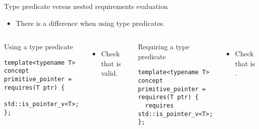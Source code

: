 \begin{frame}[t,fragile]{Type predicate versus nested requirements evaluation}
\begin{itemize}
  \item There is a difference when using type predicates.
\end{itemize}

\begin{columns}[T]

\begin{block}{Using a type predicate}
\begin{lstlisting}
template<typename T>
concept primitive_pointer = requires(T ptr) {
  std::is_pointer_v<T>;
};
\end{lstlisting}
\end{block}

\begin{itemize}
  \item Check that  is valid.
\end{itemize}

\begin{block}{Requiring a type predicate}
\begin{lstlisting}
template<typename T>
concept primitive_pointer = requires(T ptr) {
  requires std::is_pointer_v<T>;
};
\end{lstlisting}
\end{block}

\begin{itemize}
  \item Check that  is .
\end{itemize}

\end{columns}
\end{frame}
